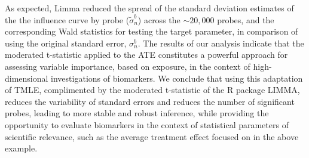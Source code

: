 As expected, Limma reduced the spread of the standard deviation estimates of
the the influence curve by probe ($\widetilde{\sigma}^b_n$) across the
$\sim 20,000$ probes, and the corresponding Wald statistics for testing the
target parameter, in comparison of using the original standard error,
$\sigma^b_n$. The results of our analysis indicate that the moderated
t-statistic applied to the ATE constitutes a powerful approach for assessing
variable importance, based on exposure, in the context of high-dimensional
investigations of biomarkers. We conclude that using this adaptation of TMLE,
complimented by the moderated t-statistic of the R package LIMMA, reduces the
variability of standard errors and reduces the number of significant probes,
leading to more stable and robust inference, while providing the opportunity to
evaluate biomarkers in the context of statistical parameters of scientific
relevance, such as the average treatment effect focused on in the above example.
